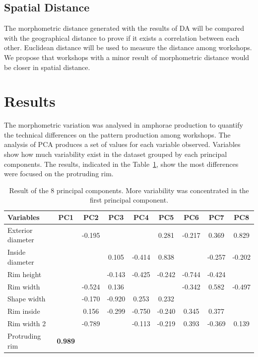 \documentclass[review]{elsarticle}
\newcommand{\memo}[2]{\textcolor{#1}{#2}}
\newcommand{\xavi}[1]{\memo{orange}{xavi: #1\\}}
\begin{document}

\subsection{Spatial Distance}

The morphometric distance generated with the results of DA will be compared with the geographical distance to prove if it exists a correlation between each other. Euclidean distance will be used to measure the distance among workshops. We propose that workshops with a minor result of morphometric distance would be closer in spatial distance. 

\section{Results}

The morphometric variation was analysed in amphorae production to quantify the technical differences on the pattern production among workshops. 
The analysis of PCA produces a set of values for each variable observed. Variables show how much variability exist in the dataset grouped by each principal components. The results, indicated in the Table~\ref{table:variable}, show the most differences were focused on the protruding rim. 

\begin{table}[htp]
\begin{tabular}{lcccccccc}
\hline
 Variables		&    PC1 & PC2	& PC3 & PC4 & PC5 & PC6 & PC7 & PC8     \\ \hline
 Exterior diameter& 		 &-0.195	&	  &  	&0.281&-0.217&0.369&0.829           \\
 Inside diameter& 		 &		&0.105&-0.414&0.838&	    &-0.257&-0.202           \\
 Rim height&              &      &-0.143&-0.425&-0.242&-0.744&-0.424&           \\
 Rim width&       		 &-0.524	&0.136&  	&	  &-0.342&0.582&-0.497        \\
 Shape width&     		 &-0.170	&-0.920&0.253&0.232&		&     &          \\
 Rim inside&     		 &0.156 &-0.299&-0.750&-0.240&0.345&0.377&          \\                                    
 Rim width 2& 	         &-0.789	&	  &-0.113&-0.219	&0.393&-0.369&0.139          \\	
Protruding rim& \textbf{0.989} &      &      &     &     &     &     &          \\
\hline
\end{tabular}
\caption{Result of the 8 principal components. More variability was concentrated in the first principal component.}
\label{table:variable}
\end{table}
\end{document}
